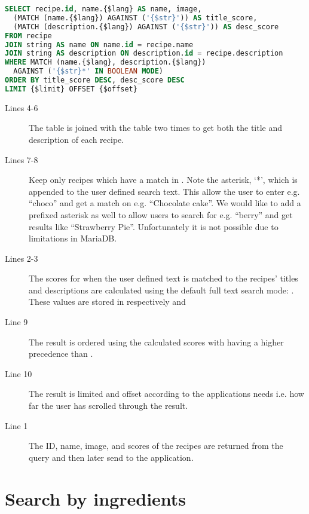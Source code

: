 \begin{lstlisting}[language=SQL, morekeywords={AGAINST,OFFSET,BOOLEAN,MODE}, float=h, label={lst:freetext}, caption={Free-text search.}]
SELECT recipe.id, name.{$lang} AS name, image,
  (MATCH (name.{$lang}) AGAINST ('{$str}')) AS title_score,
  (MATCH (description.{$lang}) AGAINST ('{$str}')) AS desc_score
FROM recipe
JOIN string AS name ON name.id = recipe.name
JOIN string AS description ON description.id = recipe.description
WHERE MATCH (name.{$lang}, description.{$lang})
  AGAINST ('{$str}*' IN BOOLEAN MODE)
ORDER BY title_score DESC, desc_score DESC
LIMIT {$limit} OFFSET {$offset}
\end{lstlisting}
\begin{description}
\item[Lines 4-6] The  table is joined with the  table two times to get both the title and description of each recipe.
\item[Lines 7-8] Keep only recipes which have a match in . Note the asterisk, `*', which is appended to the user defined search text. This allow the user to enter e.g. ``choco'' and get a match on e.g. ``Chocolate cake''. We would like to add a prefixed asterisk as well to allow users to search for e.g. ``berry'' and get results like ``Strawberry Pie''. Unfortunately it is not possible due to limitations in MariaDB.
\item[Lines 2-3] The scores for when the user defined text is matched to the recipes' titles and descriptions are calculated using the default full text search mode: . These values are stored in respectively  and 
\item[Line 9] The result is ordered using the calculated scores with  having a higher precedence than .
\item[Line 10] The result is limited and offset according to the applications needs i.e. how far the user has scrolled through the result.
\item[Line 1] The ID, name, image, and scores of the recipes are returned from the query and then later send to the application.
\end{description}



\section{Search by ingredients}

